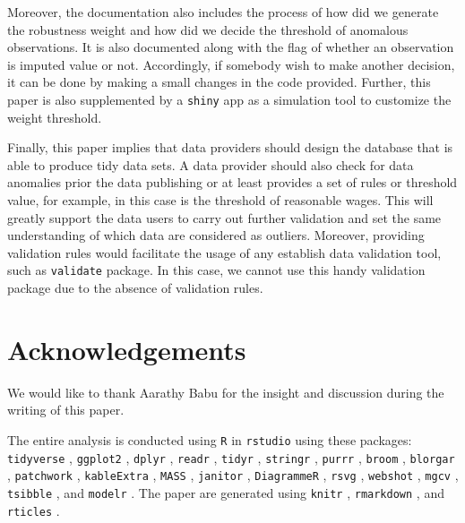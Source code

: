 Moreover, the documentation also includes the process of how did we
generate the robustness weight and how did we decide the threshold of
anomalous observations. It is also documented along with the flag of
whether an observation is imputed value or not. Accordingly, if somebody
wish to make another decision, it can be done by making a small changes
in the code provided. Further, this paper is also supplemented by a
\texttt{shiny} \citep{shiny} app as a simulation tool to customize the
weight threshold.

Finally, this paper implies that data providers should design the
database that is able to produce tidy data sets. A data provider should
also check for data anomalies prior the data publishing or at least
provides a set of rules or threshold value, for example, in this case is
the threshold of reasonable wages. This will greatly support the data
users to carry out further validation and set the same understanding of
which data are considered as outliers. Moreover, providing validation
rules would facilitate the usage of any establish data validation tool,
such as \texttt{validate} \citep{validate} package. In this case, we
cannot use this handy validation package due to the absence of
validation rules.

\hypertarget{acknowledgements}{%
\section{Acknowledgements}\label{acknowledgements}}

We would like to thank Aarathy Babu for the insight and discussion
during the writing of this paper.

The entire analysis is conducted using \texttt{R} \citep{R} in
\texttt{rstudio} using these packages: \texttt{tidyverse}
\citep{tidyverse}, \texttt{ggplot2} \citep{ggplot2}, \texttt{dplyr}
\citep{dplyr}, \texttt{readr} \citep{readr}, \texttt{tidyr}
\citep{tidyr}, \texttt{stringr} \citep{stringr}, \texttt{purrr}
\citep{purrr}, \texttt{broom} \citep{broom}, \texttt{blorgar}
\citep{brolgar}, \texttt{patchwork} \citep{patchwork},
\texttt{kableExtra} \citep{kableExtra}, \texttt{MASS} \citep{mass},
\texttt{janitor} \citep{janitor}, \texttt{DiagrammeR}
\citep{DiagrammeR}, \texttt{rsvg} \citep{rsvg}, \texttt{webshot}
\citep{webshot}, \texttt{mgcv} \citep{mgcv}, \texttt{tsibble}
\citep{tsibble}, and \texttt{modelr} \citep{modelr}. The paper are
generated using \texttt{knitr} \citep{knitr}, \texttt{rmarkdown}
\citep{rmarkdown}, and \texttt{rticles} \citep{rticles}.

